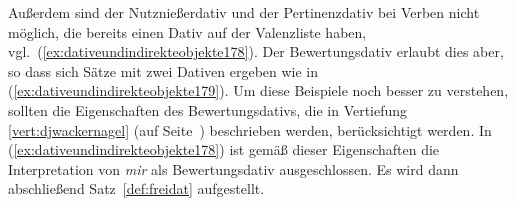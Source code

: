 \begin{exe}
\end{exe}

Außerdem sind der Nutznießerdativ und der Pertinenzdativ bei Verben nicht möglich, die bereits einen Dativ auf der Valenzliste haben, vgl.\ (\ref{ex:dativeundindirekteobjekte178}).
Der Bewertungsdativ erlaubt dies aber, so dass sich Sätze mit zwei Dativen ergeben wie in (\ref{ex:dativeundindirekteobjekte179}).
Um diese Beispiele noch besser zu verstehen, sollten die Eigenschaften des Bewertungsdativs, die in Vertiefung \ref{vert:djwackernagel} (auf Seite~\pageref{vert:djwackernagel}) beschrieben werden, berücksichtigt werden.
In (\ref{ex:dativeundindirekteobjekte178}) ist gemäß dieser Eigenschaften die Interpretation von \textit{mir} als Bewertungsdativ ausgeschlossen.
Es wird dann abschließend Satz~\ref{def:freidat} aufgestellt.

\begin{exe}
  \ex\label{ex:dativeundindirekteobjekte177}
  \begin{xlist}
  \end{xlist}
\end{exe}



